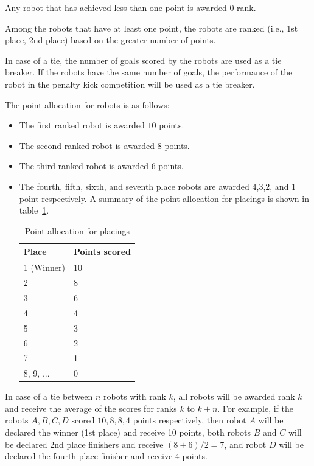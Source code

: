 \documentclass[12pt]{hurocup}
\begin{document}
\begin{lawlist}[US]
\item Any robot that has achieved less than one point is awarded $0$
  rank.

\item Among the robots that have at least one point, the robots are
  ranked (i.e., 1st place, 2nd place) based on the greater number of
  points.

\item In case of a tie, the number of goals scored by the robots are
  used as a tie breaker. If the robots have the same number of goals,
  the performance of the robot in the penalty kick competition will be
  used as a tie breaker.

\item The point allocation for robots is as follows:
  \begin{itemize}
  \item The first ranked robot is awarded $10$ points.
  \item The second ranked robot is awarded $8$ points.
  \item The third ranked robot is awarded $6$ points.
  \item The fourth, fifth, sixth, and seventh place robots are awarded
    $4$,$3$,$2$, and $1$ point respectively.  A summary of the point
    allocation for placings is shown in table~\ref{point-allocation}.

    \begin{table}
      \begin{center}
        \begin{tabular}{l|l}
          \hline
          Place & Points scored \\
          \hline
          1 (Winner) & 10 \\
          2          & 8 \\
          3          & 6 \\
          4          & 4 \\
          5          & 3 \\
          6          & 2 \\
          7          & 1 \\
          8, 9, ...  & 0 \\
          \hline
        \end{tabular}
      \end{center}
      \caption{Point allocation for placings}
      \label{point-allocation}
    \end{table}
  \end{itemize}

\item In case of a tie between $n$ robots with rank $k$, all robots
  will be awarded rank $k$ and receive the average of the scores for
  ranks $k$ to $k+n$.  For example, if the robots $A,B,C,D$ scored
  $10, 8, 8, 4$ points respectively, then robot $A$ will be declared
  the winner (1st place) and receive 10 points, both robots $B$ and
  $C$ will be declared 2nd place finishers and receive $(8+6)/2=7$,
  and robot $D$ will be declared the fourth place finisher and receive
  $4$ points.

\end{lawlist}
\end{document}

